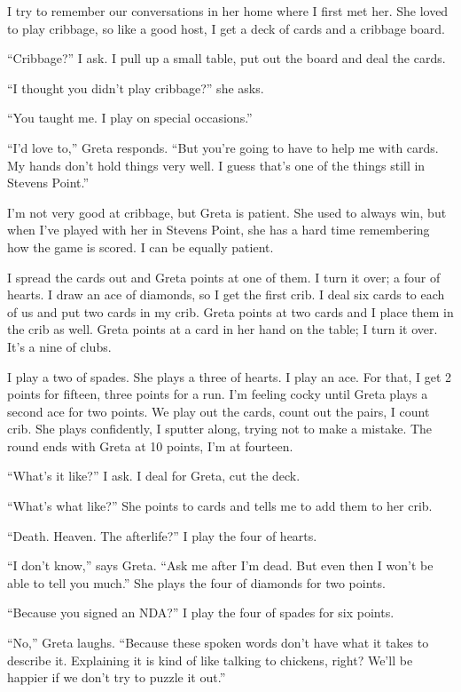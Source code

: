 \documentclass[
  letterpaper,
  DIV=11,
  numbers=noendperiod]{scrreprt}
\begin{document}
I try to remember our conversations in her home where I first met her.
She loved to play cribbage, so like a good host, I get a deck of cards
and a cribbage board.

``Cribbage?'' I ask. I pull up a small table, put out the board and deal
the cards.

``I thought you didn't play cribbage?'' she asks.

``You taught me. I play on special occasions.''

``I'd love to,'' Greta responds. ``But you're going to have to help me
with cards. My hands don't hold things very well. I guess that's one of
the things still in Stevens Point.''

I'm not very good at cribbage, but Greta is patient. She used to always
win, but when I've played with her in Stevens Point, she has a hard time
remembering how the game is scored. I can be equally patient.

I spread the cards out and Greta points at one of them. I turn it over;
a four of hearts. I draw an ace of diamonds, so I get the first crib. I
deal six cards to each of us and put two cards in my crib. Greta points
at two cards and I place them in the crib as well. Greta points at a
card in her hand on the table; I turn it over. It's a nine of clubs.

I play a two of spades. She plays a three of hearts. I play an ace. For
that, I get 2 points for fifteen, three points for a run. I'm feeling
cocky until Greta plays a second ace for two points. We play out the
cards, count out the pairs, I count crib. She plays confidently, I
sputter along, trying not to make a mistake. The round ends with Greta
at 10 points, I'm at fourteen.

``What's it like?'' I ask. I deal for Greta, cut the deck.

``What's what like?'' She points to cards and tells me to add them to
her crib.

``Death. Heaven. The afterlife?'' I play the four of hearts.

``I don't know,'' says Greta. ``Ask me after I'm dead. But even then I
won't be able to tell you much.'' She plays the four of diamonds for two
points.

``Because you signed an NDA?'' I play the four of spades for six points.

``No,'' Greta laughs. ``Because these spoken words don't have what it
takes to describe it. Explaining it is kind of like talking to chickens,
right? We'll be happier if we don't try to puzzle it out.''
\end{document}
